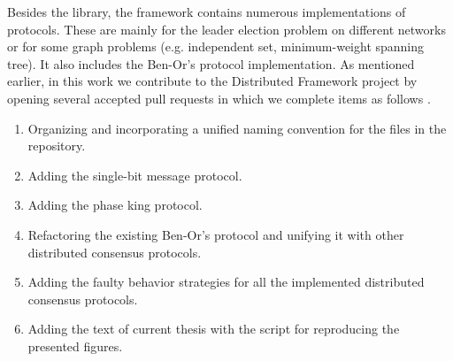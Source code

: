 Besides the library, the framework contains numerous implementations of protocols. These are mainly for the leader election problem on different networks or for some graph problems (e.g. independent set, minimum-weight spanning tree). It also includes the Ben-Or's protocol implementation. As mentioned earlier, in this work we contribute to the Distributed Framework project by opening several accepted pull requests in which we complete items as follows \cite{Pac22a, Pac22b, Pac22c, Pac22d}.

\begin{enumerate}
    \item Organizing and incorporating a unified naming convention for the files in the repository.
    \item Adding the single-bit message protocol.
    \item Adding the phase king protocol.
    \item Refactoring the existing Ben-Or's protocol and unifying it with other distributed consensus protocols.
    \item Adding the faulty behavior strategies for all the implemented distributed consensus protocols.
    \item Adding the text of current thesis with the script for reproducing the presented figures.
\end{enumerate}